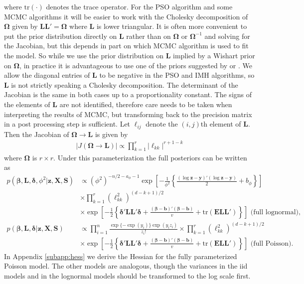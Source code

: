 \documentclass[12pt]{article}
\begin{document}
where $\mathrm{tr}(\cdot)$ denotes the trace operator. For the PSO algorithm and some MCMC algorithms it will be easier to work with the Cholesky decomposition of $\bm{\Omega}$ given by $\bm{L}\bm{L}'=\bm{\Omega}$ where $\bm{L}$ is lower triangular. It is often more convenient to put the prior distribution directly on $\bm{L}$ rather than on $\bm{\Omega}$ or $\bm{\Omega}^{-1}$ and solving for the Jacobian, but this depends in part on which MCMC algorithm is used to fit the model. So while we use the prior distribution on $\bm{L}$ implied by a Wishart prior on $\bm{\Omega}$, in practice it is advantageous to use one of the priors suggested by \citet{chen2003random} or \citet{fruhwirth2008bayesian}. We allow the diagonal entries of $\bm{L}$ to be negative in the PSO and IMH algorithms, so $\bm{L}$ is not strictly speaking a Cholesky decomposition. The determinant of the Jacobian is the same in both cases up to a proportionality constant. The signs of the elements of $\bm{L}$ are not identified, therefore care needs to be taken when interpreting the results of MCMC, but transforming back to the precision matrix in a post processing step is sufficient. Let $\ell_{ij}$ denote the $(i,j)$th element of $\bm{L}$. Then the Jacobian of $\bm{\Omega}\to\bm{L}$ is given by
\begin{align*}
|J(\bm{\Omega}\to\bm{L})| \propto \prod_{k=1}^r |\ell_{kk}|^{r + 1 - k}
\end{align*}
where $\bm{\Omega}$ is $r\times r$. Under this parameterization the full posteriors can be written as
\begin{align*}
p(\bm{\beta}, \bm{L}, \bm{\delta}, \phi^2|\bm{z}, \bm{X}, \bm{S})& \propto (\phi^2)^{-n/2 - a_\phi - 1}\exp\left[-\frac{1}{\phi^2}\left\{\frac{(\log\bm{z} - \bm{y})'(\log\bm{z} - \bm{y})}{2} + b_\phi\right\}\right]\\
&\times  \prod_{k=1}^r (\ell_{kk}^2)^{(d - k + 1)/2}\\
&\times \exp\left[-\frac{1}{2}\left\{\bm{\delta}'\bm{L}\bm{L}'\bm{\delta}+\frac{(\bm{\beta} - \bm{b})'(\bm{\beta} - \bm{b})}{v} + \mathrm{tr}(\bm{E}\bm{L}\bm{L}')\right\}\right]\mbox{\ \ \ \ \ (full lognormal),}\\
p(\bm{\beta}, \bm{L}, \bm{\delta}|\bm{z}, \bm{X}, \bm{S})& \propto \prod_{i=1}^n \frac{\exp\{-\exp(y_i)\}\exp(y_iz_i)}{z_i!} \times \prod_{k=1}^r (\ell_{kk}^2)^{(d - k + 1)/2}  \\
&\times \exp\left[-\frac{1}{2}\left\{\bm{\delta}'\bm{L}\bm{L}'\bm{\delta}+\frac{(\bm{\beta} - \bm{b})'(\bm{\beta} - \bm{b})}{v} + \mathrm{tr}(\bm{E}\bm{L}\bm{L}')\right\}\right]\mbox{\ \ \ \ \ (full Poisson).}
\end{align*}
In Appendix \ref{subapp:hess} we derive the Hessian for the fully parameterized Poisson model. The other models are analogous, though the variances in the iid models and in the lognormal models should be transformed to the log scale first.
\end{document}
